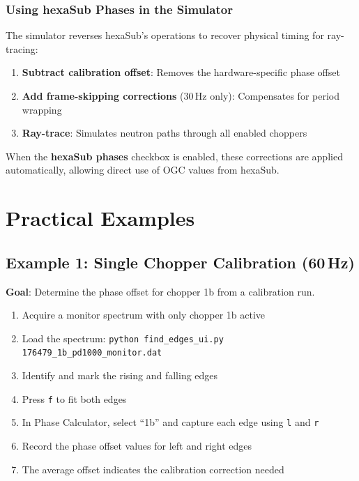 \documentclass[11pt,letterpaper]{article}
\begin{document}
\subsubsection{Using hexaSub Phases in the Simulator}

The simulator reverses hexaSub's operations to recover physical timing for ray-tracing:

\begin{enumerate}
    \item \textbf{Subtract calibration offset}: Removes the hardware-specific phase offset
    \item \textbf{Add frame-skipping corrections} (30\,Hz only): Compensates for period wrapping
    \item \textbf{Ray-trace}: Simulates neutron paths through all enabled choppers
\end{enumerate}

When the \textbf{hexaSub phases} checkbox is enabled, these corrections are applied automatically, 
allowing direct use of OGC values from hexaSub.

\section{Practical Examples}

\subsection{Example 1: Single Chopper Calibration (60\,Hz)}

\textbf{Goal}: Determine the phase offset for chopper 1b from a calibration run.

\begin{enumerate}
    \item Acquire a monitor spectrum with only chopper 1b active
    \item Load the spectrum: \texttt{python find\_edges\_ui.py 176479\_1b\_pd1000\_monitor.dat}
    \item Identify and mark the rising and falling edges
    \item Press \texttt{f} to fit both edges
    \item In Phase Calculator, select ``1b'' and capture each edge using \texttt{l} and \texttt{r}
    \item Record the phase offset values for left and right edges
    \item The average offset indicates the calibration correction needed
\end{enumerate}
\end{document}
